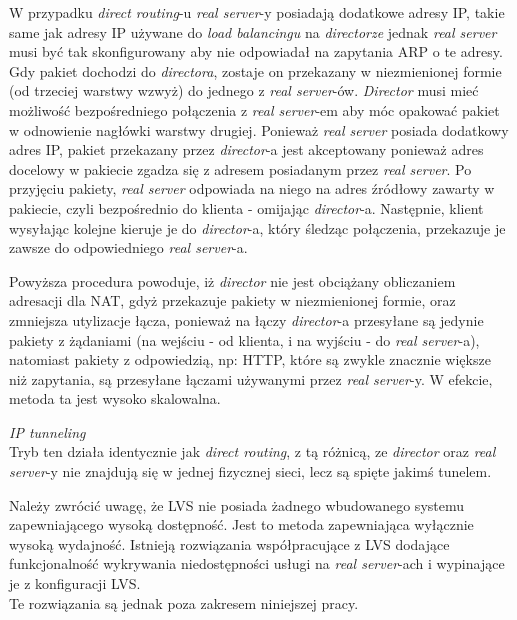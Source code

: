 {\begin{description}
		W przypadku \textit{direct routing}-u \textit{real server}-y posiadają dodatkowe adresy IP, takie same jak adresy IP używane do \textit{load balancingu} na \textit{directorze} jednak \textit{real server} musi być tak skonfigurowany aby nie odpowiadał na zapytania ARP o te adresy.\\
		Gdy pakiet dochodzi do \textit{directora}, zostaje on przekazany w niezmienionej formie (od trzeciej warstwy wzwyż) do jednego z \textit{real server}-ów. \textit{Director} musi mieć możliwość bezpośredniego połączenia z \textit{real server}-em aby móc opakować pakiet w odnowienie nagłówki warstwy drugiej.
		Ponieważ \textit{real server} posiada dodatkowy adres IP, pakiet przekazany przez \textit{director}-a jest akceptowany ponieważ adres docelowy w pakiecie zgadza się z adresem posiadanym przez \textit{real server}.
		Po przyjęciu pakiety, \textit{real server} odpowiada na niego na adres źródłowy zawarty w pakiecie, czyli bezpośrednio do klienta - omijając \textit{director}-a.
		Następnie, klient wysyłając kolejne kieruje je do \textit{director}-a, który śledząc połączenia, przekazuje je zawsze do odpowiedniego \textit{real server}-a.

		Powyższa procedura powoduje, iż \textit{director} nie jest obciążany obliczaniem adresacji dla NAT, gdyż przekazuje pakiety w niezmienionej formie, oraz zmniejsza utylizacje łącza, ponieważ na łączy \textit{director}-a przesyłane są jedynie pakiety z żądaniami (na wejściu - od klienta, i na wyjściu - do \textit{real server}-a), natomiast pakiety z odpowiedzią, np: HTTP, które są zwykle znacznie większe niż zapytania, są przesyłane łączami używanymi przez \textit{real server}-y.
		W efekcie, metoda ta jest wysoko skalowalna.
	\item{\textit{IP tunneling}}\\
		Tryb ten działa identycznie jak \textit{direct routing}, z tą różnicą, ze \textit{director} oraz \textit{real server}-y nie znajdują się w jednej fizycznej sieci, lecz są spięte jakimś tunelem.
\end{description}

Należy zwrócić uwagę, że LVS nie posiada żadnego wbudowanego systemu zapewniającego wysoką dostępność.
Jest to metoda zapewniająca wyłącznie wysoką wydajność.
Istnieją rozwiązania współpracujące z LVS dodające funkcjonalność wykrywania niedostępności usługi na \textit{real server}-ach i wypinające je z konfiguracji LVS.\\
Te rozwiązania są jednak poza zakresem niniejszej pracy.
}
